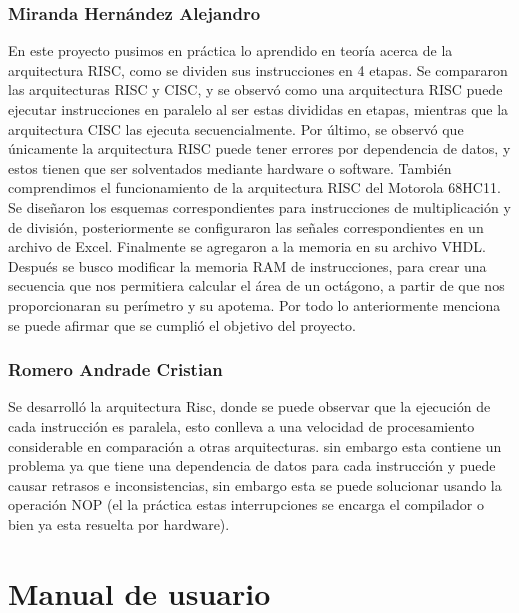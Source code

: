 \documentclass{IEEEtran}
\begin{document}
\subsubsection{Miranda Hernández Alejandro}
\label{sec:orgc6ce20b}
En este proyecto pusimos en práctica lo aprendido en teoría acerca de la arquitectura RISC, como se dividen sus instrucciones en 4 etapas. Se compararon las arquitecturas RISC y CISC, y se observó como una arquitectura RISC puede ejecutar instrucciones en paralelo al ser estas divididas en etapas, mientras que la arquitectura CISC las ejecuta secuencialmente. Por último, se observó que únicamente la arquitectura RISC puede tener errores por dependencia de datos, y estos tienen que ser solventados mediante hardware o software.
También comprendimos el funcionamiento de la arquitectura RISC del Motorola 68HC11. Se diseñaron los esquemas correspondientes para instrucciones de multiplicación y de división, posteriormente se configuraron las señales correspondientes en un archivo de Excel. Finalmente se agregaron a la memoria en su archivo VHDL.
Después se busco modificar la memoria RAM de instrucciones, para crear una secuencia que nos permitiera calcular el área de un octágono, a partir de que nos proporcionaran su perímetro y su apotema. Por todo lo anteriormente menciona se puede afirmar que se cumplió el objetivo del proyecto.
\subsubsection{Romero Andrade Cristian}
\label{sec:org85c6669}
Se desarrolló la arquitectura Risc, donde se puede observar que la ejecución de cada instrucción es paralela, esto conlleva a una velocidad de procesamiento considerable en comparación a otras arquitecturas. sin embargo esta contiene un problema ya que tiene una dependencia de datos para cada instrucción y puede causar retrasos e inconsistencias, sin embargo esta se puede solucionar usando la operación NOP (el la práctica estas interrupciones se encarga el compilador o bien ya esta resuelta por hardware).
\section{Manual de usuario}
\label{sec:orgd3665fc}
\end{document}

